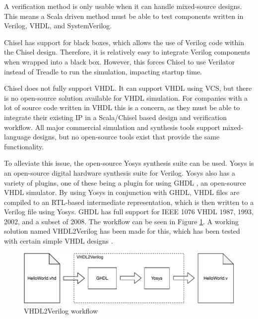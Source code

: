 \documentclass[conference]{IEEEtran}
\newcommand{\martin}[1]{{\color{blue} Martin: #1}}
\newcommand{\simon}[1]{{\color{green} Simon: #1}}
\newcommand{\kasper}[1]{{\color{purple} Kasper: #1}}
\renewcommand{\martin}[1]{}
\renewcommand{\simon}[1]{}
\renewcommand{\kasper}[1]{}
\begin{document}
A verification method is only usable when it can handle mixed-source designs.
This means a Scala driven method must be able to test components written in Verilog,
VHDL, and SystemVerilog.

Chisel has support for black boxes, which allows the use of Verilog code within the Chisel design.
Therefore, it is relatively easy to integrate Verilog components when wrapped into a black box.
However, this forces Chisel to use Verilator instead of Treadle to run the simulation, impacting
startup time.

Chisel does not fully support VHDL. It can support VHDL using VCS, but there is no
open-source solution available for VHDL simulation. For companies with a lot of source code written in VHDL this is a concern, as they must be able to integrate their existing IP in a Scala/Chisel based design and verification workflow.
All major commercial simulation and synthesis tools support mixed-language designs, but no open-source tools exist that provide the same functionality.

\simon{Refs for Yosys and GHDL are missing}

\martin{Simon, the latest version does not really use a gate list, but something other. Can you elaborate?}
\kasper{From what you showed on Tuesday, it seems that Yosys/GHDL doesn't use the gate-level implementation, but works at the RTL level}

To alleviate this issue, the open-source Yosys synthesis suite \cite{Yosys} can be used. Yosys is an open-source digital hardware synthesis suite for Verilog. Yosys also has a variety of plugins, one of these being a plugin for using GHDL \cite{ghdl}, an open-source VHDL simulator. By using Yosys in conjunction with GHDL, VHDL files are compiled to an RTL-based intermediate representation, which is then written to a Verilog file using Yosys. GHDL has full support for IEEE 1076 VHDL 1987, 1993, 2002, and a subset of 2008. The workflow can be seen in Figure \ref{fig:VHDL2Verilog}. A working solution named VHDL2Verilog has been made for this, which has been tested with certain simple VHDL designs \cite{vhdl2verilog}.

\begin{figure}
    \centering
    \includegraphics[width=\columnwidth]{VHDL2Verilog.pdf}
    \caption{VHDL2Verilog workflow}
    \label{fig:VHDL2Verilog}
\end{figure}
\end{document}
